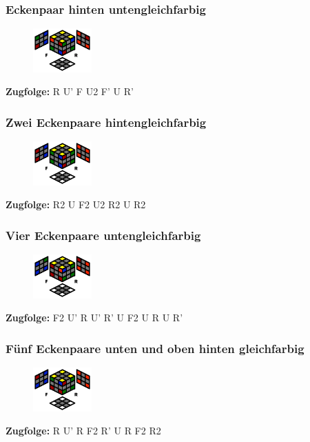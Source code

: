 \documentclass[letterpaper,10pt,twoside,twocolumn,openany]{book}
\begin{document}
\subsubsection{Eckenpaar hinten unten\newline gleichfarbig}
\begin{figure}[!htb] 
  \centering
     \includegraphics[width=0.20\textwidth]{img/orient-db-solved.png}
\end{figure}
\centering \textbf{Zugfolge:} R U' F U2 F' U R'

\subsubsection{Zwei Eckenpaare hinten\newline gleichfarbig}
\begin{figure}[!htb] 
  \centering
     \includegraphics[width=0.20\textwidth]{img/orient-db-ub-solved.png}
\end{figure}
\centering \textbf{Zugfolge:} R2 U F2 U2 R2 U R2 

\subsubsection{Vier Eckenpaare unten\newline gleichfarbig}
\begin{figure}[!htb] 
  \centering
     \includegraphics[width=0.20\textwidth]{img/orient-4d-solved.png}
\end{figure}
\centering \textbf{Zugfolge:} F2 U' R U' R' U F2 U R U R' 

\newpage
\subsubsection{Fünf Eckenpaare unten und oben hinten gleichfarbig}
\begin{figure}[!htb] 
  \centering
     \includegraphics[width=0.20\textwidth]{img/orient-uf-not-solved.png}
\end{figure}
\centering \textbf{Zugfolge:} R U' R F2 R' U R F2 R2 
        
\end{document}
